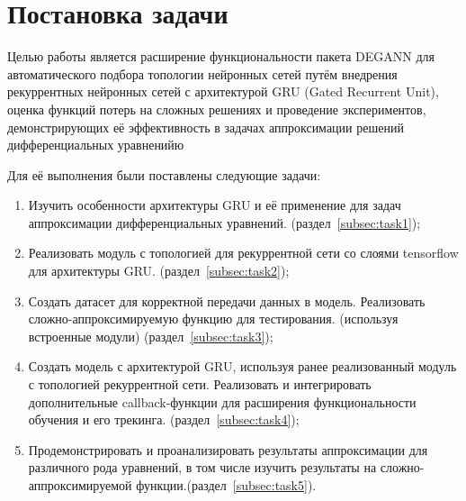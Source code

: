 
\section{Постановка задачи}
\label{sec:task}

Целью работы является расширение функциональности пакета DEGANN для автоматического подбора топологии нейронных сетей путём внедрения рекуррентных нейронных сетей с архитектурой GRU (Gated Recurrent Unit), оценка функций потерь на сложных решениях и проведение экспериментов, демонстрирующих её эффективность в задачах аппроксимации решений дифференциальных уравненийю

Для её выполнения были поставлены следующие задачи:
\begin{enumerate}
    \item Изучить особенности архитектуры GRU и её применение для задач аппроксимации дифференциальных уравнений. (раздел~\ref{subsec:task1});
    \item Реализовать модуль с топологией для рекуррентной сети со слоями tensorflow для архитектуры GRU. (раздел~\ref{subsec:task2});
    \item Создать датасет для корректной передачи данных в модель. Реализовать сложно-аппроксимируемую функцию для тестирования. (используя встроенные модули) (раздел~\ref{subsec:task3});
    \item Создать модель с архитектурой GRU, используя ранее реализованный модуль с топологией рекуррентной сети. Реализовать и интегрировать дополнительные callback-функции для расширения функциональности обучения и его трекинга. (раздел~\ref{subsec:task4});
    \item Продемонстрировать и проанализировать результаты аппроксимации для различного рода уравнений, в том числе изучить результаты на сложно-аппроксимируемой функции.(раздел~\ref{subsec:task5}).
\end{enumerate}
